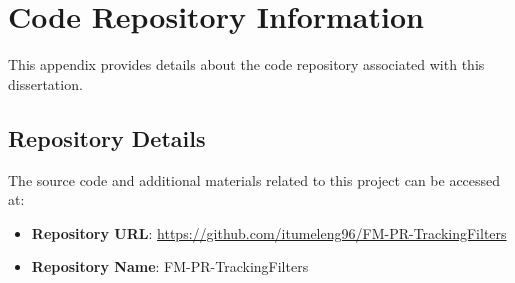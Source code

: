 \appendix
\chapter{Code Repository Information}
\label{appendix:repo}

This appendix provides details about the code repository associated with this dissertation.

\section{Repository Details}
The source code and additional materials related to this project can be accessed at:

\begin{itemize}
    \item \textbf{Repository URL}: \url{https://github.com/itumeleng96/FM-PR-TrackingFilters}
    \item \textbf{Repository Name}: FM-PR-TrackingFilters
\end{itemize}

